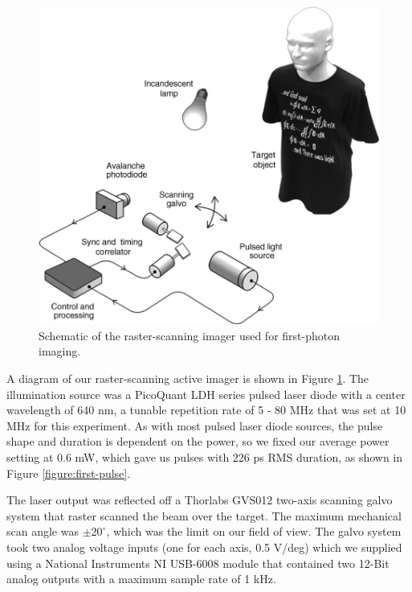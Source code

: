 \begin{figure}[htb]
\centerline{\includegraphics[width=14cm]{figure-first-setup.pdf}}
\caption{Schematic of the raster-scanning imager used for first-photon imaging.}
\label{figure:first-setup}
\end{figure}

A diagram of our raster-scanning active imager is shown in Figure \ref{figure:first-setup}. The illumination source was a PicoQuant LDH series pulsed laser diode with a center wavelength of 640 nm, a tunable repetition rate of 5 - 80 MHz that was set at 10 MHz for this experiment. As with most pulsed laser diode sources, the pulse shape and duration is dependent on the power, so we fixed our average power setting at 0.6 mW, which gave us pulses with 226 ps RMS duration, as shown in Figure \ref{figure:first-pulse}.

The laser output was reflected off a Thorlabs GVS012 two-axis scanning galvo system that raster scanned the beam over the target. The maximum mechanical scan angle was $\pm 20^\circ$, which was the limit on our field of view. The galvo system took two analog voltage inputs (one for each axis, 0.5 V/deg) which we supplied using a National Instruments NI USB-6008 module that contained two 12-Bit analog outputs with a maximum sample rate of 1 kHz.

